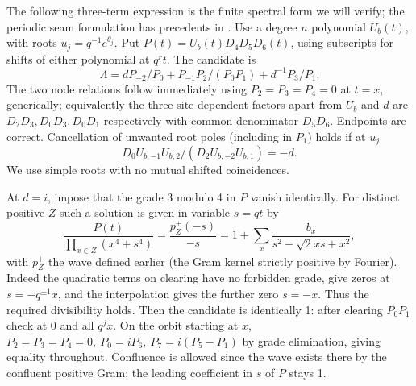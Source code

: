 The following three-term expression is the finite spectral form we will verify; the periodic seam formulation has precedents in \cite[Section~2]{ZhouBatchelor1997}. Use a degree \(n\) polynomial \(U_b(t)\), with roots \(u_j=q^{-1}e^{\theta_j}\). Put \(P(t)=U_b(t)D_4D_5D_6(t)\), using subscripts for shifts of either polynomial at \(q^r t\). The candidate is
\[
 \Lambda= d P_{-2}/P_0+P_{-1}P_2/(P_0P_1)+d^{-1}P_3/P_1.
\]
The two node relations follow immediately using \(P_2=P_3=P_4=0\) at \(t=x\), generically; equivalently the three site-dependent factors apart from \(U_b\) and \(d\) are \(D_2D_3,D_0D_3,D_0D_1\) respectively with common denominator \(D_5D_6\). Endpoints are correct. Cancellation of unwanted root poles (including in \(P_1\)) holds if at \(u_j\)
\[
 D_0 U_{b,-1}U_{b,2}/(D_2 U_{b,-2} U_{b,1})=-d .
\]
We use simple roots with no mutual shifted coincidences.

At \(d=i\), impose that the grade 3 modulo 4 in \(P\) vanish identically. For distinct positive \(Z\) such a solution is given in variable \(s=qt\) by
\[
 \frac{P(t)}{\prod_{x\in Z}(x^4+s^4)}=
 \frac{p_Z^+(-s)}{-s}=1+\sum_x \frac{b_x}{s^2-\sqrt2 x s+x^2},
\]
with \(p_Z^+\) the wave defined earlier (the Gram kernel strictly positive by Fourier). Indeed the quadratic terms on clearing have no forbidden grade, give zeros at \(s=-q^{\pm1}x\), and the interpolation gives the further zero \(s=-x\). Thus the required divisibility holds. Then the candidate is identically 1: after clearing \(P_0P_1\) check at \(0\) and all \(q^j x\). On the orbit starting at \(x\), \(P_2=P_3=P_4=0,\ P_0=iP_6,\ P_7=i(P_5-P_1)\) by grade elimination, giving equality throughout. Confluence is allowed since the wave exists there by the confluent positive Gram; the leading coefficient in \(s\) of \(P\) stays 1.

